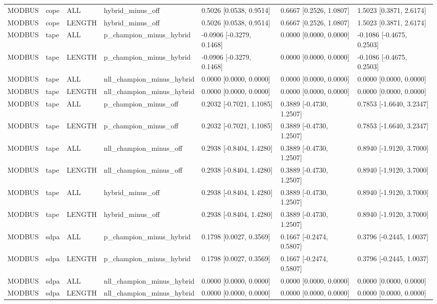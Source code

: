 \begin{tabular}{lllllll}
MODBUS & cope & ALL & hybrid\_minus\_off & 0.5026 [0.0538, 0.9514] & 0.6667 [0.2526, 1.0807] & 1.5023 [0.3871, 2.6174] \\
MODBUS & cope & LENGTH & hybrid\_minus\_off & 0.5026 [0.0538, 0.9514] & 0.6667 [0.2526, 1.0807] & 1.5023 [0.3871, 2.6174] \\
MODBUS & tape & ALL & p\_champion\_minus\_hybrid & -0.0906 [-0.3279, 0.1468] & 0.0000 [0.0000, 0.0000] & -0.1086 [-0.4675, 0.2503] \\
MODBUS & tape & LENGTH & p\_champion\_minus\_hybrid & -0.0906 [-0.3279, 0.1468] & 0.0000 [0.0000, 0.0000] & -0.1086 [-0.4675, 0.2503] \\
MODBUS & tape & ALL & nll\_champion\_minus\_hybrid & 0.0000 [0.0000, 0.0000] & 0.0000 [0.0000, 0.0000] & 0.0000 [0.0000, 0.0000] \\
MODBUS & tape & LENGTH & nll\_champion\_minus\_hybrid & 0.0000 [0.0000, 0.0000] & 0.0000 [0.0000, 0.0000] & 0.0000 [0.0000, 0.0000] \\
MODBUS & tape & ALL & p\_champion\_minus\_off & 0.2032 [-0.7021, 1.1085] & 0.3889 [-0.4730, 1.2507] & 0.7853 [-1.6640, 3.2347] \\
MODBUS & tape & LENGTH & p\_champion\_minus\_off & 0.2032 [-0.7021, 1.1085] & 0.3889 [-0.4730, 1.2507] & 0.7853 [-1.6640, 3.2347] \\
MODBUS & tape & ALL & nll\_champion\_minus\_off & 0.2938 [-0.8404, 1.4280] & 0.3889 [-0.4730, 1.2507] & 0.8940 [-1.9120, 3.7000] \\
MODBUS & tape & LENGTH & nll\_champion\_minus\_off & 0.2938 [-0.8404, 1.4280] & 0.3889 [-0.4730, 1.2507] & 0.8940 [-1.9120, 3.7000] \\
MODBUS & tape & ALL & hybrid\_minus\_off & 0.2938 [-0.8404, 1.4280] & 0.3889 [-0.4730, 1.2507] & 0.8940 [-1.9120, 3.7000] \\
MODBUS & tape & LENGTH & hybrid\_minus\_off & 0.2938 [-0.8404, 1.4280] & 0.3889 [-0.4730, 1.2507] & 0.8940 [-1.9120, 3.7000] \\
MODBUS & sdpa & ALL & p\_champion\_minus\_hybrid & 0.1798 [0.0027, 0.3569] & 0.1667 [-0.2474, 0.5807] & 0.3796 [-0.2445, 1.0037] \\
MODBUS & sdpa & LENGTH & p\_champion\_minus\_hybrid & 0.1798 [0.0027, 0.3569] & 0.1667 [-0.2474, 0.5807] & 0.3796 [-0.2445, 1.0037] \\
MODBUS & sdpa & ALL & nll\_champion\_minus\_hybrid & 0.0000 [0.0000, 0.0000] & 0.0000 [0.0000, 0.0000] & 0.0000 [0.0000, 0.0000] \\
MODBUS & sdpa & LENGTH & nll\_champion\_minus\_hybrid & 0.0000 [0.0000, 0.0000] & 0.0000 [0.0000, 0.0000] & 0.0000 [0.0000, 0.0000] \\

\end{tabular}
